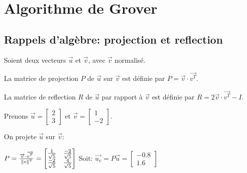 \chapter{Algorithme de Grover}

\section{Rappels d'algèbre: projection et reflection}

Soient deux vecteurs $\overrightarrow{u}$ et $\overrightarrow{v}$, avec $\overrightarrow{v}$ normalisé.

\begin{definition}
  La matrice de projection $P$ de $\overrightarrow{u}$ sur $\overrightarrow{v}$ est définie par $P = \overrightarrow{v} \cdot \overrightarrow{v^T}$.
\end{definition}

\begin{definition}
  La matrice de reflection $R$ de $\overrightarrow{u}$ par rapport à $\overrightarrow{v}$ est définie par $R = 2 \overrightarrow{v} \cdot \overrightarrow{v^T} - I$.
\end{definition}

\begin{ex}
Prenons $\overrightarrow{u}=\begin{bmatrix}2\\3\end{bmatrix}$ et $\overrightarrow{v}=\begin{bmatrix}1\\-2\end{bmatrix}$.

On projete $\overrightarrow{u}$ sur $\overrightarrow{v}$:

$P = \frac{\overrightarrow{v} \cdot \overrightarrow{v^T}}{\left\lVert v\right\rVert^2} = \begin{bmatrix}\frac{1}{\sqrt{5}} & \frac{-2}{\sqrt{5}}\\\frac{-2}{\sqrt{5}} & \frac{4}{\sqrt{5}}\end{bmatrix}$
\medbreak
Soit: $\overrightarrow{u_v} = P\overrightarrow{u} = \begin{bmatrix}-0.8\\1.6\end{bmatrix}$
\end{ex}


